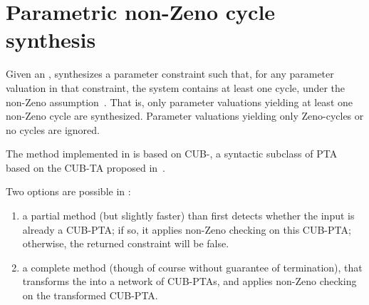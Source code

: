 \section{Parametric non-Zeno cycle synthesis}\label{ss:mode:Zeno}

Given an \NIPTA{}, \imitator{} synthesizes a parameter constraint such that, for any parameter valuation in that constraint, the system contains at least one cycle, under the non-Zeno assumption~\cite{ANPS17}.
That is, only parameter valuations yielding at least one non-Zeno cycle are synthesized.
Parameter valuations yielding only Zeno-cycles or no cycles are ignored.

The method implemented in \imitator{} is based on CUB-\IPTA{}, a syntactic subclass of PTA based on the CUB-TA proposed in~\cite{WSWLSDYL15}.

Two options are possible in \imitator{}:
\begin{enumerate}
	\item a partial method (but slightly faster) than first detects whether the input \NIPTA{} is already a CUB-PTA; if so, it applies non-Zeno checking on this CUB-PTA; otherwise, the returned constraint will be false.
	

	
	\item a complete method (though of course without guarantee of termination), that transforms the \NIPTA{} into a network of CUB-PTAs, and applies non-Zeno checking on the transformed CUB-PTA.
	

\end{enumerate}



